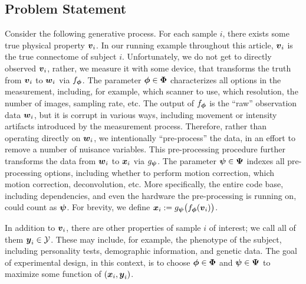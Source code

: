 \documentclass{article}
\begin{document}
\subsection{Problem Statement}

Consider the following generative process.  For each sample $i$, there exists some true physical property $\boldsymbol{v}_i$.  In our running example throughout this article, $\boldsymbol{v}_i$ is the true connectome of subject $i$.
Unfortunately, we do not get to directly observed $\boldsymbol{v}_i$, rather, we measure it with some device, that transforms the truth from $\boldsymbol{v}_i$ to $\boldsymbol{w}_i$ via $f_{\boldsymbol{\phi}}$.  The parameter $\boldsymbol{\phi} \in \boldsymbol{\Phi}$ characterizes all options in the measurement, including, for example, which scanner to use, which resolution, the number of images, sampling rate, etc.  The output of $f_{\boldsymbol{\phi}}$ is the  ``raw'' observation data $\boldsymbol{w}_i$, but it is corrupt in various ways, including movement or intensity artifacts introduced by the measurement process.  Therefore, rather than operating directly on $\boldsymbol{w}_i$, we intentionally ``pre-process'' the data, in an effort to remove a number of nuisance variables.  This pre-processing procedure further transforms the data from $\boldsymbol{w}_i$ to $\boldsymbol{x}_i$ via $g_{\boldsymbol{\psi}}$.   The parameter $\boldsymbol{\psi} \in \boldsymbol{\Psi}$ indexes all pre-processing options, including whether to perform motion correction, which motion correction, deconvolution, etc.  More specifically, the entire code base, including dependencies, and even the hardware the pre-processing is running on, could count as $\boldsymbol{\psi}$. For brevity,  we  define $\boldsymbol{x}_i:= g_{\boldsymbol{\psi}} \big(f_{\boldsymbol{\phi}} (\boldsymbol{v}_i) \big)$.

In addition to $\boldsymbol{v}_i$, there are other properties of sample $i$ of interest; we call all of them $\boldsymbol{y}_i \in \mathcal{Y}$.  These may include, for example, the phenotype of the subject, including personality tests, demographic information, and genetic data.  The goal of experimental design, in this context, is to choose $\boldsymbol{\phi} \in \boldsymbol{\Phi}$ and $\boldsymbol{\psi} \in \boldsymbol{\Psi}$ to maximize some function of  $(\boldsymbol{x}_i, \boldsymbol{y}_i)$.  
\end{document}
